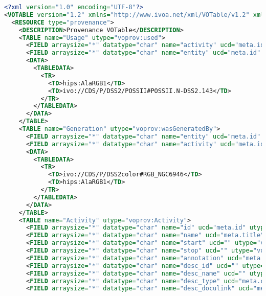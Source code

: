 \begin{lstlisting}[language=XML, caption= PROV-VOTABLE serialisation example for a Color composition Activity]
<?xml version="1.0" encoding="UTF-8"?>
<VOTABLE version="1.2" xmlns="http://www.ivoa.net/xml/VOTable/v1.2" xmlns:hips="http://cds.u-strasbg.fr/data/" xmlns:ivo="http://www.ivoa.net/documents/rer/ivo/" xmlns:voprov="http://www.ivoa.net/documents/dm/provdm/voprov/" xmlns:xsi="http://www.w3.org/2001/XMLSchema-instance" xsi:schemaLocation="http://www.ivoa.net/xml/VOTable/v1.2 http://www.ivoa.net/xml/VOTable/VOTable-1.2.xsd">
  <RESOURCE type="provenance">
    <DESCRIPTION>Provenance VOTable</DESCRIPTION>
    <TABLE name="Usage" utype="voprov:used">
      <FIELD arraysize="*" datatype="char" name="activity" ucd="meta.id" utype="voprov:Usage.activity"/>
      <FIELD arraysize="*" datatype="char" name="entity" ucd="meta.id" utype="voprov:Usage.entity"/>
      <DATA>
        <TABLEDATA>
          <TR>
            <TD>hips:AlaRGB1</TD>
            <TD>ivo://CDS/P/DSS2/POSSII#POSSII.N-DSS2.143</TD>
          </TR>
        </TABLEDATA>
      </DATA>
    </TABLE>
    <TABLE name="Generation" utype="voprov:wasGeneratedBy">
      <FIELD arraysize="*" datatype="char" name="entity" ucd="meta.id" utype="voprov:Generation.entity"/>
      <FIELD arraysize="*" datatype="char" name="activity" ucd="meta.id" utype="voprov:Generation.activity"/>
      <DATA>
        <TABLEDATA>
          <TR>
            <TD>ivo://CDS/P/DSS2color#RGB_NGC6946</TD>
            <TD>hips:AlaRGB1</TD>
          </TR>
        </TABLEDATA>
      </DATA>
    </TABLE>
    <TABLE name="Activity" utype="voprov:Activity">
      <FIELD arraysize="*" datatype="char" name="id" ucd="meta.id" utype="voprov:Activity.id"/>
      <FIELD arraysize="*" datatype="char" name="name" ucd="meta.title" utype="voprov:Activity.name"/>
      <FIELD arraysize="*" datatype="char" name="start" ucd="" utype="voprov:Activity.startTime"/>
      <FIELD arraysize="*" datatype="char" name="stop" ucd="" utype="voprov:Activity.endTime"/>
      <FIELD arraysize="*" datatype="char" name="annotation" ucd="meta.description" utype="voprov:Activity.annotation"/>
      <FIELD arraysize="*" datatype="char" name="desc_id" ucd="" utype="voprov:ActivityDescription.id"/>
      <FIELD arraysize="*" datatype="char" name="desc_name" ucd="" utype="voprov:ActivityDescription.name"/>
      <FIELD arraysize="*" datatype="char" name="desc_type" ucd="meta.code.class" utype="voprov:ActivityDescription.type"/>
      <FIELD arraysize="*" datatype="char" name="desc_doculink" ucd="meta.ref.url" utype="voprov:ActivityDescription.doculink"/>

\end{lstlisting}
